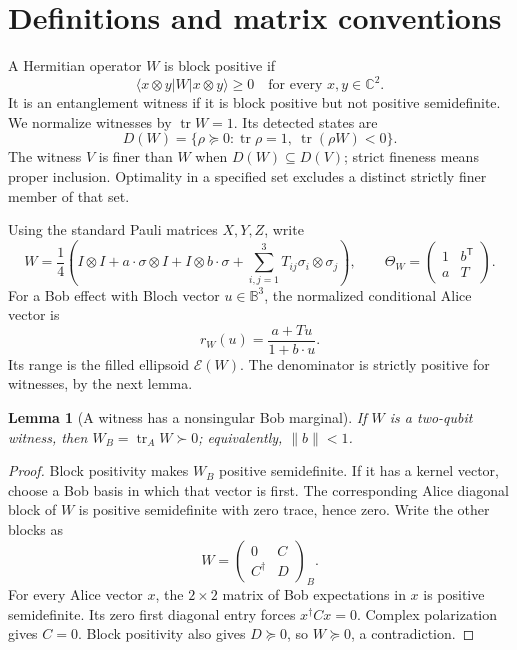 \documentclass[11pt,a4paper]{article}
\newtheorem{lemma}[theorem]{Lemma}
\theoremstyle{definition}\newtheorem{definition}[theorem]{Definition}
\newcommand{\tr}{\operatorname{tr}}
\newcommand{\B}{\mathbb B^3}
\newcommand{\E}{\mathcal E}
\newcommand{\C}{\mathbb C}
\newcommand{\ket}[1]{\lvert #1\rangle}
\newcommand{\bra}[1]{\langle #1\rvert}
\newcommand{\II}{I\otimes I}
\theoremstyle{plain}\newtheorem*{theorem*}{Theorem}
\begin{document}
\section{Definitions and matrix conventions}

A Hermitian operator $W$ is block positive if
\[
 \bra{x\otimes y}W\ket{x\otimes y}\geq0\quad\text{for every }x,y\in\C^2.
\]
It is an entanglement witness if it is block positive but not positive semidefinite. We normalize witnesses by $\tr W=1$. Its detected states are
\[
 D(W)=\{\rho\succeq0:\tr\rho=1,\ \tr(\rho W)<0\}.
\]
The witness $V$ is finer than $W$ when $D(W)\subseteq D(V)$; strict fineness means proper inclusion. Optimality in a specified set excludes a distinct strictly finer member of that set.

Using the standard Pauli matrices $X,Y,Z$, write
\begin{equation}\label{eq:bloch}
 W=\frac14\left(\II+a\cdot\sigma\otimes I+I\otimes b\cdot\sigma+
       \sum_{i,j=1}^3 T_{ij}\sigma_i\otimes\sigma_j\right),
 \qquad \Theta_W=\begin{pmatrix}1&b^{\mathsf T}\\a&T\end{pmatrix}.
\end{equation}
For a Bob effect with Bloch vector $u\in\B$, the normalized conditional Alice vector is
\begin{equation}\label{eq:fractional}
 r_W(u)=\frac{a+Tu}{1+b\cdot u}.
\end{equation}
Its range is the filled ellipsoid $\E(W)$. The denominator is strictly positive for witnesses, by the next lemma.

\begin{lemma}[A witness has a nonsingular Bob marginal]\label{lem:marginal}
If $W$ is a two-qubit witness, then $W_B=\tr_A W\succ0$; equivalently, $\|b\|<1$.
\end{lemma}
\begin{proof}
Block positivity makes $W_B$ positive semidefinite. If it has a kernel vector, choose a Bob basis in which that vector is first. The corresponding Alice diagonal block of $W$ is positive semidefinite with zero trace, hence zero. Write the other blocks as
\[
 W=\begin{pmatrix}0&C\\C^\dagger&D\end{pmatrix}_{\!B}.
\]
For every Alice vector $x$, the $2\times2$ matrix of Bob expectations in $x$ is positive semidefinite. Its zero first diagonal entry forces $x^\dagger Cx=0$. Complex polarization gives $C=0$. Block positivity also gives $D\succeq0$, so $W\succeq0$, a contradiction.
\end{proof}
\end{document}
